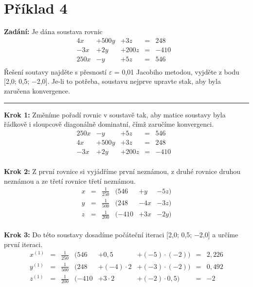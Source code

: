 \section{Příklad 4}
\textbf{Zadání:} Je dána soustava rovnic\\
\begin{displaymath}
\begin{matrix}
4x&+500y&+3z& =& 248&\\
\minus3x&+2y&+200z& =& \minus410&\\
250x&\minus y&+5z& =& 546&\\
\end{matrix}
\end{displaymath}
Řešení soutavy najděte s přesností $\varepsilon$ = 0,01 Jacobiho metodou, vyjděte z bodu [2,0; 0,5; $\minus$2,0]. Je-li to potřeba, soustavu nejprve upravte stak, aby byla zaručena konvergence. 
\par\noindent\rule{\textwidth}{0.4pt}

\textbf{Krok 1:} Změníme pořadí rovnic v soustavě tak, aby matice soustavy byla řádkově i sloupcově diagonálně dominatní, čímž zaručíme konvergenci.
\begin{displaymath}
\begin{matrix}
250x&\minus y&+5z& =& 546&\\
4x&+500y&+3z& =& 248&\\
\minus3x&+2y&+200z& =& \minus410&\\
\end{matrix}
\end{displaymath}

\textbf{Krok 2:} Z první rovnice si vyjádříme první neznámou, z druhé rovnice druhou neznámou a ze třetí rovnice třetí neznámou.
\begin{displaymath}
\begin{matrix}
x& =& \frac{1}{250}& (546& +y& \minus5z)\\
y& =& \frac{1}{500}& (248& \minus4x& \minus3z)\\
z& =& \frac{1}{200}& (\minus410& +3x& \minus2y)\\
\end{matrix}
\end{displaymath}

\textbf{Krok 3:} Do této soustavy dosadíme počáteční iteraci [2,0; 0,5; $\minus$2,0] a určíme první iteraci.
\begin{displaymath}
\begin{matrix}
x^{(1)}& =& \frac{1}{250}& (546& +0,5& +(\minus5)\cdot(\minus2)) &= &2,226\\
y^{(1)}& =& \frac{1}{500}& (248& +(\minus4)\cdot2& +(\minus3)\cdot(\minus2)) &= &0,492\\
z^{(1)}& =& \frac{1}{200}& (\minus410& +3\cdot2& +(\minus2)\cdot0,5) &= &\minus2\\
\end{matrix}
\end{displaymath}

